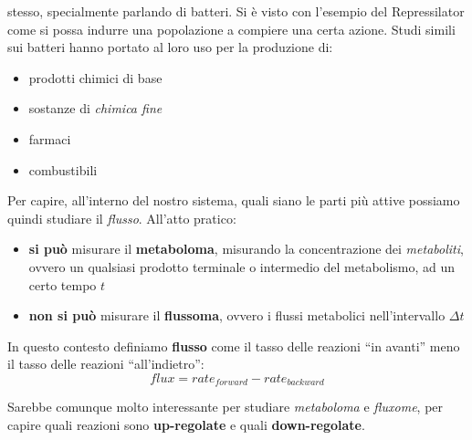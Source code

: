 \documentclass[a4paper,12pt, oneside]{book}
\begin{document}
stesso, specialmente parlando di batteri. Si è visto con l'esempio del
Repressilator come si possa indurre una popolazione a compiere una certa azione.
Studi simili sui batteri hanno portato al loro uso per la produzione di: 
\begin{itemize}
  \item prodotti chimici di base
  \item sostanze di \textit{chimica fine}
  \item farmaci
  \item combustibili
\end{itemize}
Per capire, all'interno del nostro sistema, quali siano le parti più attive
possiamo quindi studiare il \textit{flusso}.
All'atto pratico:
\begin{itemize}
  \item \textbf{si può} misurare il \textbf{metaboloma}, misurando la
  concentrazione dei \textit{metaboliti}, ovvero un qualsiasi prodotto terminale
  o intermedio del metabolismo, ad un certo tempo $t$
  \item \textbf{non si può} misurare il \textbf{flussoma}, ovvero i flussi
  metabolici nell'intervallo $\Delta t$ 
\end{itemize}
\begin{definizione}
  In questo contesto definiamo \textbf{flusso} come il tasso delle reazioni ``in
  avanti'' meno il tasso delle reazioni ``all'indietro'':
  \[flux=rate_{forward}-rate_{backward}\]
\end{definizione}
Sarebbe comunque molto interessante per studiare \textit{metaboloma} e
\textit{fluxome}, per capire quali reazioni sono \textbf{up-regolate} e quali
\textbf{down-regolate}.
\end{document}
